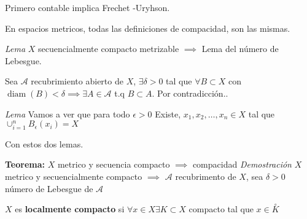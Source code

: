 Primero contable implica Frechet -Uryhson.

En espacios metricos, todas las definiciones de compacidad, son las mismas. 

\textit{Lema} $ X $ secuencialmente compacto metrizable $ \implies $ Lema del número de Lebesgue.

Sea $ \mathcal{A} $ recubrimiento abierto de $ X $, $ \exists \delta > 0 $ tal que $  \forall B \subset X $ con $ \operatorname{diam}(B) < \delta \implies \exists A \in \mathcal{A} $ t.q $ B \subset A $. Por contradicción..

\textit{Lema} Vamos a ver que para todo $  \epsilon > 0 $ Existe, $ x_1, x_2, \ldots, x_n \in X $ tal que $ \cup_{i = 1}^n B_\epsilon(x_i) = X $

Con estos dos lemas.

\textbf{Teorema:} $ X $ metrico y secuencia compacto $ \implies $ compacidad
\textit{Demostración}
 $ X $ metrico y secuencialmente compacto $ \implies $ $ \mathcal{A} $ recubrimento de $ X $, sea  $  \delta > 0 $ número de Lebesgue de $ \mathcal{A} $
 
 \begin{define}
 	$ X $ es \textbf{localmente compacto} si $ \forall x \in X \exists K \subset X $ compacto tal que $ x \in \overset{\circ}{K} $
 \end{define}